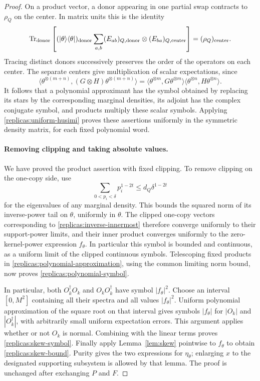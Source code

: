 \begin{proof}
On a product vector, a donor appearing in one partial swap contracts
to $\rho_Q$ on the center.  In matrix units this is the identity
\[
 \operatorname{Tr}_{\rm donor}\left[
  (\lvert \theta\rangle\langle \theta\rvert)_{\rm donor}
  \sum_{a,b}(E_{ab})_{Q,\rm donor}\otimes(E_{ba})_{Q,\rm center}
                      \right]=(\rho_Q)_{\rm center}.
\]
Tracing distinct donors successively preserves the order of the
operators on each center.  The separate centers give multiplication
of scalar expectations, since
\[
 \langle\theta^{\otimes(m+n)},(G\otimes H)
                         \theta^{\otimes(m+n)}\rangle
 =\langle\theta^{\otimes m},G\theta^{\otimes m}\rangle
  \langle\theta^{\otimes n},H\theta^{\otimes n}\rangle.
\]
It follows that a polynomial approximant has the
symbol obtained by replacing its stars by the corresponding marginal
densities, its adjoint has the complex conjugate symbol, and products
multiply these scalar symbols.  Applying
\eqref{replicas:uniform-husimi} proves these assertions uniformly in
the symmetric density matrix, for each fixed polynomial word.

\paragraph{Removing clipping and taking absolute values.}
We have proved the product assertion with fixed clipping.  To remove
clipping on the one-copy side, use
\[
 \sum_{0<p_i<\delta}p_i^{1-2t}
       \le d_Q\delta^{1-2t}
\]
for the eigenvalues of any marginal density.  This bounds the squared
norm of its inverse-power tail on $\theta$, uniformly in $\theta$.
The clipped one-copy vectors corresponding to
\eqref{replicas:inverse-innermost} therefore converge uniformly to their
support-power limits, and their inner product converges uniformly to
the zero-kernel-power expression $f_\theta$.
In particular this
symbol is bounded and continuous, as a uniform limit of the clipped
continuous symbols.  Telescoping fixed products in
\eqref{replicas:polynomial-approximation}, using the common limiting
norm bound, now proves \eqref{replicas:polynomial-symbol}.

In particular, both $O_k^\dagger O_k$ and $O_kO_k^\dagger$ have
symbol $|f_\theta|^2$.  Choose an interval $[0,M^2]$ containing all
their spectra and all values $|f_\theta|^2$.  Uniform polynomial
approximation of the square root on that interval gives symbols
$|f_\theta|$ for $|O_k|$ and $|O_k^\dagger|$, with arbitrarily small
uniform expectation errors.  This argument applies whether or not
$O_k$ is normal.  Combining with the linear terms proves
\eqref{replicas:skew-symbol}.  Finally apply
Lemma~\ref{lem:skew} pointwise to $f_\theta$ to obtain
\eqref{replicas:skew-bound}.  Purity gives the two expressions for
$\eta_\theta$; enlarging $x$ to the designated supporting subsystem
is allowed by that lemma.  The proof is unchanged after exchanging
$P$ and $F$.
\end{proof}

